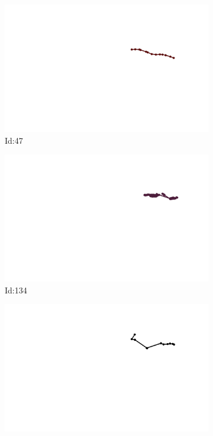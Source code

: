 \documentclass[12pt,twoside]{report}
\begin{document}
\begin{figure}
\centering
\begin{subfigure}[b]{0.20\textwidth}
\centering
\includegraphics[width=\textwidth]{../../trajectories/47.png}
\caption{Id:47}
\end{subfigure}
\begin{subfigure}[b]{0.20\textwidth}
\centering
\includegraphics[width=\textwidth]{../../trajectories/134.png}
\caption{Id:134}
\end{subfigure}
\begin{subfigure}[b]{0.20\textwidth}
\centering
\includegraphics[width=\textwidth]{../../trajectories/147.png}

\end{subfigure}
\end{figure}
\end{document}
